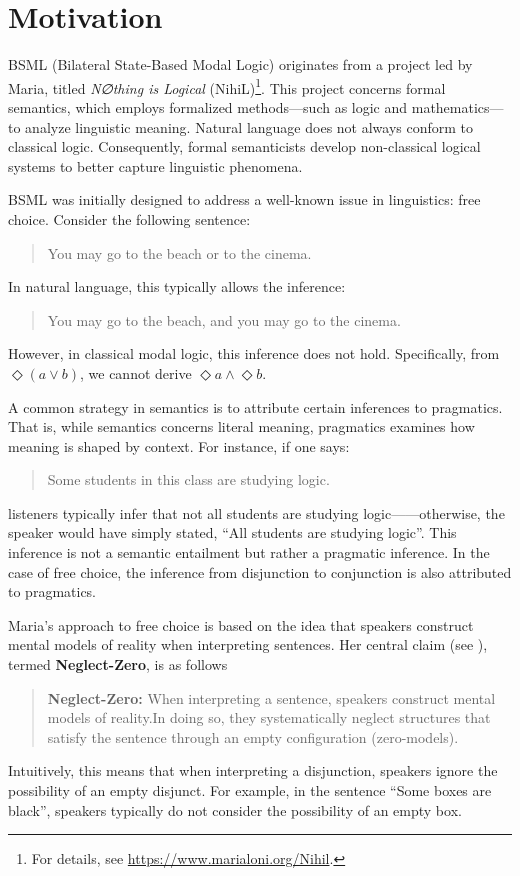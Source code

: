 \section{Motivation}\label{Motivation}

BSML (Bilateral State-Based Modal Logic) originates from a project led by Maria, 
titled \textit{N∅thing is Logical} (NihiL)\footnote{For details, see \url{https://www.marialoni.org/Nihil}.}. 
This project concerns formal semantics, which employs formalized methods—such as logic and mathematics—to analyze linguistic meaning. 
Natural language does not always conform to classical logic. Consequently, formal semanticists develop non-classical logical systems to better capture linguistic phenomena.

BSML was initially designed to address a well-known issue in linguistics: free choice. Consider the following sentence:

\begin{quote}
    You may go to the beach or to the cinema.
\end{quote}

In natural language, this typically allows the inference:

\begin{quote}
    You may go to the beach, and you may go to the cinema.
\end{quote}

However, in classical modal logic, this inference does not hold. Specifically, from $\Diamond (a \vee b)$, we cannot derive $\Diamond a \land \Diamond b$.

A common strategy in semantics is to attribute certain inferences to pragmatics. 
That is, while semantics concerns literal meaning, pragmatics examines how meaning is shaped by context. For instance, if one says:

\begin{quote}
    Some students in this class are studying logic.
\end{quote}

listeners typically infer that not all students are studying logic——otherwise, the speaker would have simply stated, ``All students are studying logic''.
This inference is not a semantic entailment but rather a pragmatic inference.
In the case of free choice, the inference from disjunction to conjunction is also attributed to pragmatics.

Maria's approach to free choice is based on the idea that speakers construct mental models of reality when interpreting sentences. Her central claim (see \citet{Aloni2022}), termed \textbf{Neglect-Zero}, is as follows
\begin{quote}
    \textbf{Neglect-Zero:} 
     When interpreting a sentence, speakers construct mental models of reality.In doing so, they systematically neglect structures that satisfy the sentence through an empty configuration (zero-models).
    
\end{quote}
Intuitively, this means that when interpreting a disjunction, speakers ignore the possibility of an empty disjunct. For example, in the sentence ``Some boxes are black'', speakers typically do not consider the possibility of an empty box.


